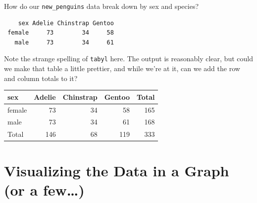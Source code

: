 \documentclass[
]{book}
\newenvironment{Shaded}{\begin{snugshade}}{\end{snugshade}}
\newcommand{\CommentTok}[1]{\textcolor[rgb]{0.56,0.35,0.01}{\textit{#1}}}
\newcommand{\DataTypeTok}[1]{\textcolor[rgb]{0.13,0.29,0.53}{#1}}
\newcommand{\KeywordTok}[1]{\textcolor[rgb]{0.13,0.29,0.53}{\textbf{#1}}}
\newcommand{\NormalTok}[1]{#1}
\newcommand{\OperatorTok}[1]{\textcolor[rgb]{0.81,0.36,0.00}{\textbf{#1}}}
\newcommand{\StringTok}[1]{\textcolor[rgb]{0.31,0.60,0.02}{#1}}
\begin{document}
How do our \texttt{new\_penguins} data break down by sex and species?

\begin{Shaded}
\end{Shaded}

\begin{verbatim}
    sex Adelie Chinstrap Gentoo
 female     73        34     58
   male     73        34     61
\end{verbatim}

Note the strange spelling of \texttt{tabyl} here. The output is reasonably clear, but could we make that table a little prettier, and while we're at it, can we add the row and column totals to it?

\begin{Shaded}
\end{Shaded}

\begin{tabular}{l|r|r|r|r}
\hline
sex & Adelie & Chinstrap & Gentoo & Total\\
\hline
female & 73 & 34 & 58 & 165\\
\hline
male & 73 & 34 & 61 & 168\\
\hline
Total & 146 & 68 & 119 & 333\\
\hline
\end{tabular}

\hypertarget{visualizing-the-data-in-a-graph-or-a-few}{%
\section{Visualizing the Data in a Graph (or a few\ldots)}\label{visualizing-the-data-in-a-graph-or-a-few}}
\end{document}
